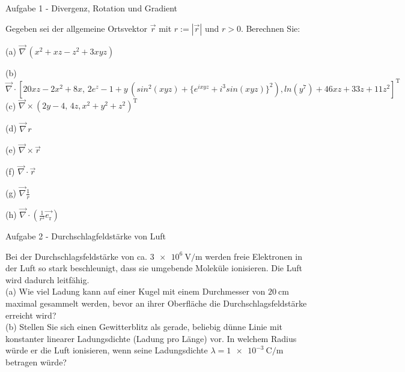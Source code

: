 \begin{frame}[t]{Aufgabe 1 - Divergenz, Rotation und Gradient}

    Gegeben sei der allgemeine Ortsvektor $\vec{r}$ mit $r := |\vec{r}|$ und $r > 0$. Berechnen Sie: 
    
    (a) $\vec{\nabla}\, (x^2 + xz - z^2 +3xyz)$
    
(b) $\vec{\nabla} \cdot [20xz - 2x^2 + 8x,\, 2e^z -1 + y\, (sin^2(xyz) + \{e^{ixyz} + i^3 sin(xyz)\}^2), ln(y^7) + 46xz + 33z + 11z^2]^\text{T}$
\\    
    (c) $\vec{\nabla} \times (2y -4,\, 4z, x^2 + y^2 + z^2)^\text{T}$

    (d) $\vec{\nabla}\, r$
    
    (e) $\vec{\nabla} \times \vec{r}$
    
    (f) $\vec{\nabla} \cdot \vec{r}$
    
    (g) $\vec{\nabla} \frac{1}{r}$
    
    (h) $\vec{\nabla} \cdot (\frac{1}{r^2} \vec{e_\text{r}})$

\end{frame}


\begin{frame}[t]{Aufgabe 2 - Durchschlagfeldstärke von Luft}

    Bei der Durchschlagsfeldstärke von ca. $\SI{3e6}{\volt\per\meter}$ werden freie Elektronen in der Luft so stark
beschleunigt, dass sie umgebende Moleküle ionisieren. Die Luft wird dadurch leitfähig.
\\
(a) Wie viel Ladung kann auf einer Kugel mit einem Durchmesser von $\SI{20}{\centi\meter}$ maximal gesammelt
werden, bevor an ihrer Oberfläche die Durchschlagsfeldstärke erreicht wird?
\\
(b) Stellen Sie sich einen Gewitterblitz als gerade, beliebig dünne Linie mit konstanter linearer
Ladungsdichte (Ladung pro Länge) vor. In welchem Radius würde er die Luft ionisieren, wenn
seine Ladungsdichte $\lambda = \SI{1e-3}{\coulomb\per\meter} $ betragen würde?

\end{frame}

